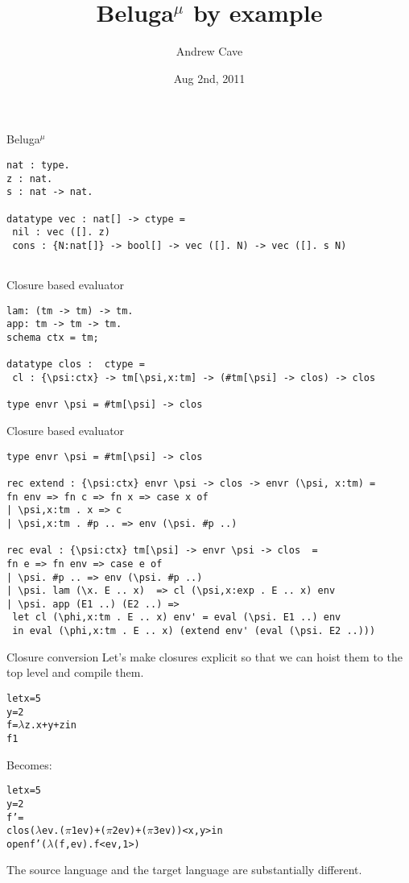 \documentclass{beamer}
\title[]{Beluga$^\mu$ by example}
\author{Andrew Cave}
\date{Aug 2nd, 2011}
\begin{document}
\begin{frame}
\titlepage
\end{frame}

\begin{frame}[fragile]{Beluga$^\mu$}
\begin{lstlisting}
nat : type.
z : nat.
s : nat -> nat.

datatype vec : nat[] -> ctype =
 nil : vec ([]. z)
 cons : {N:nat[]} -> bool[] -> vec ([]. N) -> vec ([]. s N)
 
\end{lstlisting}
\end{frame}

\begin{frame}[fragile]{Closure based evaluator}
\begin{lstlisting}
lam: (tm -> tm) -> tm.              
app: tm -> tm -> tm.
schema ctx = tm;

datatype clos :  ctype =
 cl : {\psi:ctx} -> tm[\psi,x:tm] -> (#tm[\psi] -> clos) -> clos

type envr \psi = #tm[\psi] -> clos
\end{lstlisting}
\end{frame}

\begin{frame}[fragile]{Closure based evaluator}
\begin{lstlisting}
type envr \psi = #tm[\psi] -> clos

rec extend : {\psi:ctx} envr \psi -> clos -> envr (\psi, x:tm) =
fn env => fn c => fn x => case x of
| \psi,x:tm . x => c
| \psi,x:tm . #p .. => env (\psi. #p ..)

rec eval : {\psi:ctx} tm[\psi] -> envr \psi -> clos  =
fn e => fn env => case e of
| \psi. #p .. => env (\psi. #p ..)
| \psi. lam (\x. E .. x)  => cl (\psi,x:exp . E .. x) env
| \psi. app (E1 ..) (E2 ..) =>
 let cl (\phi,x:tm . E .. x) env' = eval (\psi. E1 ..) env
 in eval (\phi,x:tm . E .. x) (extend env' (eval (\psi. E2 ..)))
\end{lstlisting}
\end{frame}

\begin{frame}[fragile]{Closure conversion}
Let's make closures explicit so that we can hoist them to the top level and compile them.

\begin{alltt}
let x = 5
    y = 2
    f = \(\lambda\)z. x + y + z in
  f 1
\end{alltt}

Becomes:

\begin{alltt}
let x = 5
    y = 2
    f' =
 clos (\(\lambda\)ev. (\(\pi\) 1 ev) + (\(\pi\) 2 ev) + (\(\pi\) 3 ev)) < x , y > in
 open f' (\(\lambda\)(f,ev). f < ev , 1 >)
\end{alltt}

The source language and the target language are substantially different.
\end{frame}
\end{document}
